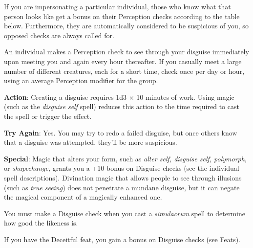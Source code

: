 				
If you are impersonating a particular individual, those who know what that person looks like get a bonus on their Perception checks according to the table below. Furthermore, they are automatically considered to be suspicious of you, so opposed checks are always called for.
				
An individual makes a Perception check to see through your disguise immediately upon meeting you and again every hour thereafter. If you casually meet a large number of different creatures, each for a short time, check once per day or hour, using an average Perception modifier for the group. 
				
\textbf{Action}: Creating a disguise requires 1d3 \mbox{$\times$} 10 minutes of work. Using magic (such as the \textit{disguise self} spell) reduces this action to the time required to cast the spell or trigger the effect.
				
\textbf{Try Again}: Yes. You may try to redo a failed disguise, but once others know that a disguise was attempted, they'll be more suspicious.
				
\textbf{Special}: Magic that alters your form, such as \textit{alter self, disguise self, polymorph}, or \textit{shapechange, }grants you a +10 bonus on Disguise checks (see the individual spell descriptions). Divination magic that allows people to see through illusions (such as \textit{true seeing}) does not penetrate a mundane disguise, but it can negate the magical component of a magically enhanced one.
				
You must make a Disguise check when you cast a \textit{simulacrum }spell to determine how good the likeness is.
				
If you have the Deceitful feat, you gain a bonus on Disguise checks (see Feats).
        	

